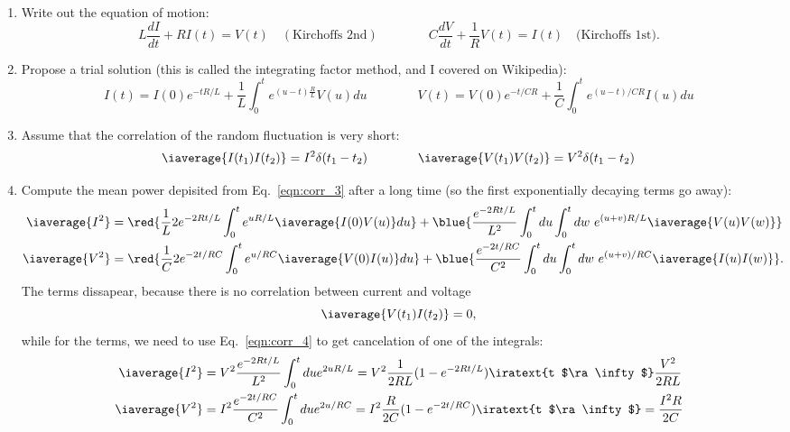   \begin{enumerate}
  	\item Write out the equation of motion:
  	\begin{equation}\label{eqn:corr_2}
  		L\frac{dI}{dt} + RI(t) = V(t) \quad (\text{Kirchoffs 2nd})\qquad\qquad C\frac{dV}{dt} + \frac{1}{R}V(t) = I(t) \quad \text{(Kirchoffs 1st)}.
  	\end{equation}
  	\item Propose a trial solution (this is called the integrating factor method, and I covered on Wikipedia):
  	\begin{equation}\label{eqn:corr_3}
  		I(t) = I(0)e^{-tR/L} + \frac{1}{L}\int_0^t e^{({u-t})\frac{R}{L}}V(u)du\qquad\qquad V(t) = V(0)e^{-t/CR} + \frac{1}{C}\int_0^t e^{({u-t})/{CR}{}}I(u)du
  	\end{equation}
  	\item Assume that the correlation of the random fluctuation is very short:
  	\begin{equation}\label{eqn:corr_4}
  		\iaverage{I(t_1)I(t_2)} = I^2\delta(t_1-t_2)\qquad\qquad \iaverage{V(t_1)V(t_2)} = V^2\delta(t_1-t_2)
  	\end{equation}
  	\item Compute the mean power depisited from Eq.~\eqref{eqn:corr_3} after a long time (so the first exponentially decaying terms go away):
  	\begin{equation}\label{key}
  	\begin{aligned}
  		\iaverage{I^2} & =\red{ \frac{1}{L}2e^{-2Rt/L}\int_0^{t}e^{uR/L} \iaverage{I(0)V(u)}du} + \blue{\frac{e^{-2Rt/L}}{L^2}\int_0^tdu\int_0^tdw\ e^{(u+v)R/L}\iaverage{V(u)V(w)}}\\
		\iaverage{V^2} & =\red{ \frac{1}{C}2e^{-2t/RC}\int_0^{t}e^{u/RC} \iaverage{V(0)I(u)}du} + \blue{\frac{e^{-2t/RC}}{C^2}\int_0^tdu\int_0^tdw\ e^{(u+v)/RC}\iaverage{I(u)I(w)}}.\\
  	\end{aligned}
  	\end{equation}
  	\noindent The  terms dissapear, because there is no correlation between current and voltage
  	\[
  		\iaverage{V(t_1)I(t_2)} = 0,
  	\]
  	\noindent while for the  terms, we need to use Eq.~\eqref{eqn:corr_4} to get cancelation of one of the integrals:
  	\begin{equation}\label{eqn:corr_5}
  	\begin{aligned}
  		\iaverage{I^2}& = {V^2\frac{e^{-2Rt/L}}{L^2}\int_0^tdu e^{2uR/L}} = V^2\frac{1}{2RL}(1-e^{-2Rt/L}) \iratext{t $\ra \infty$} \frac{V^2}{2RL}\\
	\iaverage{V^2} & = {I^2\frac{e^{-2t/RC}}{C^2}\int_0^tdu e^{2u/RC}} = I^2\frac{R}{2C}(1-e^{-2t/RC})\iratext{t $\ra \infty$} = \frac{I^2R}{2C}\\
  	\end{aligned}
  	\end{equation}
  	

\end{enumerate}
